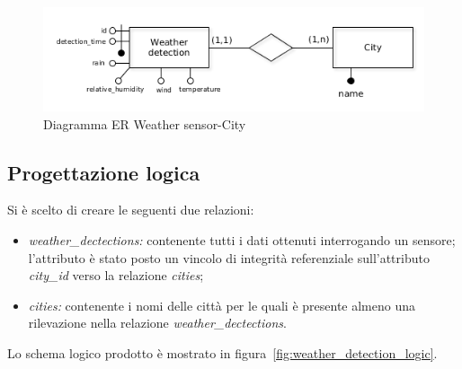 \begin{figure}[H]                                                                                                                                                            
\centering                                                                                                                                                                   
\includegraphics[width=\textwidth]{diagrams/weather_detection_er}                                                                                                                                   
\caption{Diagramma ER Weather sensor-City}                                                                                                                                            
\label{fig:weather_detection_er}                                                                                                                                                           
\end{figure}

\subsection{Progettazione logica}

Si è scelto di creare le seguenti due relazioni:
\begin{itemize}
\item \textit{weather\_dectections:} contenente tutti i dati ottenuti interrogando un sensore;
l'attributo è stato posto un vincolo di integrità referenziale sull'attributo
\textit{city\_id} verso la relazione \textit{cities};
\item \textit{cities:} contenente i nomi delle città per le quali è presente almeno una
rilevazione nella relazione \textit{weather\_dectections}.
\end{itemize}
Lo schema logico prodotto è mostrato in figura~\ref{fig:weather_detection_logic}.

